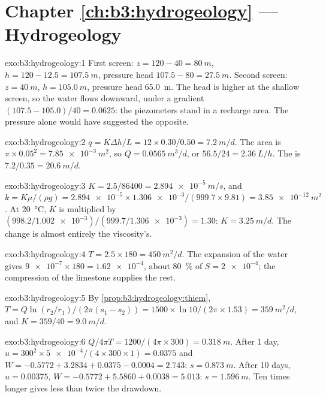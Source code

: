 \section*{Chapter \ref{ch:b3:hydrogeology} --- Hydrogeology}

\begin{solution}{exo:b3:hydrogeology:1}
First screen: $z = 120 - 40 = \qty{80}{m}$, $h = 120 - 12.5 =
\qty{107.5}{m}$, pressure head $107.5 - 80 = \qty{27.5}{m}$. Second
screen: $z = \qty{40}{m}$, $h = \qty{105.0}{m}$, pressure head
\qty{65.0}{m}. The head is higher at the shallow screen, so the water
flows downward, under a gradient $(107.5 - 105.0)/40 = \num{0.0625}$:
the piezometers stand in a recharge area. The pressure alone would have
suggested the opposite.
\end{solution}

\begin{solution}{exo:b3:hydrogeology:2}
$q = K\Delta h/L = 12\times0.30/0.50 = \qty{7.2}{m/d}$. The area is
$\pi\times0.05^2 = \qty{7.85e-3}{m^2}$, so $Q = \qty{0.0565}{m^3/d}$, or
$56.5/24 = \qty{2.36}{L/h}$. The  is $7.2/0.35 =
\qty{20.6}{m/d}$.
\end{solution}

\begin{solution}{exo:b3:hydrogeology:3}
$K = 2.5/86400 = \qty{2.894e-5}{m/s}$, and $k = K\mu/(\rho g) =
\num{2.894e-5}\times\num{1.306e-3}/(999.7\times9.81) =
\qty{3.85e-12}{m^2}$. At \qty{20}{\celsius}, $K$ is multiplied by
$(998.2/\num{1.002e-3})/(999.7/\num{1.306e-3}) = \num{1.30}$: $K =
\qty{3.25}{m/d}$. The change is almost entirely the viscosity's.
\end{solution}

\begin{solution}{exo:b3:hydrogeology:4}
$T = 2.5\times180 = \qty{450}{m^2/d}$. The expansion of the water gives
$\num{9e-7}\times180 = \num{1.62e-4}$, about \qty{80}{\percent} of $S =
\num{2e-4}$; the compression of the limestone supplies the rest.
\end{solution}

\begin{solution}{exo:b3:hydrogeology:5}
By \cref{prop:b3:hydrogeology:thiem}, $T = Q\ln(r_2/r_1)/(2\pi(s_1 -
s_2)) = 1500\times\ln10/(2\pi\times1.53) = \qty{359}{m^2/d}$, and $K =
359/40 = \qty{9.0}{m/d}$.
\end{solution}

\begin{solution}{exo:b3:hydrogeology:6}
$Q/4\pi T = 1200/(4\pi\times300) = \qty{0.318}{m}$. After 1 day, $u =
300^2\times\num{5e-4}/(4\times300\times1) = \num{0.0375}$ and $W = -0.5772
+ 3.2834 + 0.0375 - 0.0004 = \num{2.743}$: $s = \qty{0.873}{m}$. After 10
days, $u = \num{0.00375}$, $W = -0.5772 + 5.5860 + 0.0038 = \num{5.013}$:
$s = \qty{1.596}{m}$. Ten times longer gives less than twice the
drawdown.
\end{solution}

